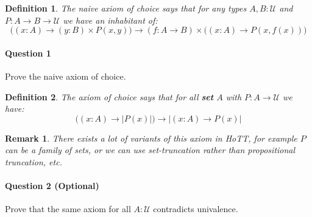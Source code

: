 \documentclass{article}[6pt]%
\newcommand{\U}{{\mathcal U}}
\renewcommand{\r}{\rightarrow}
\newtheorem{definition}{Definition}
\newtheorem{remark}{Remark}
\begin{document}
\begin{Exercise}[title={The axiom of choice}]

\begin{definition}
The naive axiom of choice says that for any types $A,B:\U$ and $P:A\r B\r \U$ we have an inhabitant of: %
\[\big((x:A)\r (y:B)\times P(x,y) \big) \r (f:A\r B) \times \big((x:A)\r P(x,f(x))\big)\]
\end{definition}

\paragraph{Question 1} Prove the naive axiom of choice.

\begin{definition}
The axiom of choice says that for all {\bf set} $A$ with $P:A\r \U$ we have:
\[ \big((x:A)\r |P(x)|\big) \r |(x:A)\r P(x)|\]
\end{definition}

\begin{remark}
There exists a lot of variants of this axiom in HoTT, for example $P$ can be a family of sets, or we can use set-truncation rather than propositional truncation, etc.
\end{remark}

\paragraph{Question 2 (Optional)} Prove that the same axiom for all $A:\U$ contradicts univalence.

\end{Exercise}
\end{document}
